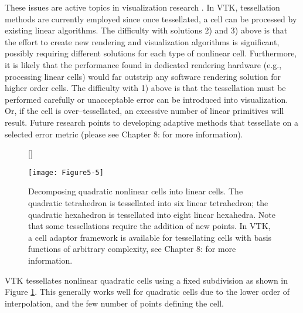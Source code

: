 These issues are active topics in visualization research \cite{Schroeder05}. In VTK, tessellation methods are currently employed since once tessellated, a cell can be processed by existing linear algorithms. The difficulty with solutions 2) and 3) above is that the effort to create new rendering and visualization algorithms is significant, possibly requiring different solutions for each type of nonlinear cell. Furthermore, it is likely that the performance found in dedicated rendering hardware (e.g., processing linear cells) would far outstrip any software rendering solution for higher order cells. The difficulty with 1) above is that the tessellation must be performed carefully or unacceptable error can be introduced into visualization. Or, if the cell is over--tessellated, an excessive number of linear primitives will result. Future research points to developing adaptive methods that tessellate on a selected error metric (please see Chapter 8:  for more information).

\begin{figure}[!htb]
	[\FBwidth]
	{\caption{Decomposing quadratic nonlinear cells into linear cells. The quadratic tetrahedron is tessellated into six linear tetrahedron; the quadratic hexahedron is tessellated into eight linear hexahedra. Note that some tessellations require the addition of new points. In VTK, a cell adaptor framework is available for tessellating cells with basis functions of arbitrary complexity, see Chapter 8:  for more information.}\label{fig:Figure5-5}}
	{\texttt{[image: Figure5-5]}}
\end{figure}

VTK tessellates nonlinear quadratic cells using a fixed subdivision as shown in Figure \ref{fig:Figure5-5}. This generally works well for quadratic cells due to the lower order of interpolation, and the few number of points defining the cell.

